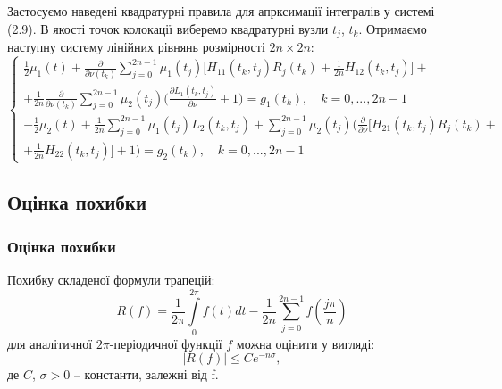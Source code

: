 \documentclass[10pt]{beamer}
\begin{document}
\begin{frame}
Застосуємо наведені квадратурні правила для апрксимації інтегралів у системі (2.9). В якості точок колокації виберемо квадратурні вузли $t_{j}$, $t_{k}$. Отримаємо наступну систему лінійних рівнянь розмірності $2n\times 2n$:
\begin{equation}
\left\{
\begin{array}{c}
\displaystyle
\frac{1}{2}\mu_1(t) + \frac{\partial}{\partial \nu(t_k)}\sum\limits_{j=0}^{2n-1} \mu_1(t_j)\Big[H_{11}(t_k,t_j)R_j(t_k)+\frac{1}{2n}H_{12}(t_k,t_j)\Big]+\\ + \frac{1}{2n}\frac{\partial}{\partial \nu(t_k)}\sum\limits_{j=0}^{2n-1} \mu_2(t_j)\bigg(\frac{\partial L_1(t_k,t_j)}{\partial \nu} + 1\bigg)
\displaystyle
= g_1(t_k), \quad k=0,...,2n-1\\
\displaystyle
-\frac{1}{2}\mu_2(t) + \frac{1}{2n}\sum\limits_{j=0}^{2n-1} \mu_1(t_j)L_2(t_k,t_j)+\sum\limits_{j=0}^{2n-1} \mu_2(t_j)\bigg(\frac{\partial}{\partial \nu}\Big[H_{21}(t_k,t_j)R_j(t_k)+\\+\frac{1}{2n}H_{22}(t_k,t_j)\Big] + 1 \bigg)
\displaystyle
=g_2(t_k), \quad k=0,...,2n-1
\end{array}
\right.
\end{equation}
\end{frame}


\subsection{Оцінка похибки}
\begin{frame}
\frametitle{Оцінка похибки}
Похибку складеної формули трапецій:
\begin{equation*}
R(f)=\frac{1}{2\pi}\int\limits_{0}^{2\pi}f(t)dt-\frac{1}{2n}\sum\limits_{j=0}^{2n-1}f(\frac{j\pi}{n})
\end{equation*}
для аналітичної $2\pi$-періодичної функції $f$ можна оцінити у вигляді:
\begin{equation*}
|R(f)|\le Ce^{-n\sigma},
\end{equation*}
де $C$, $\sigma>0$ -- константи, залежні від f. 
\end{frame}
\end{document}
